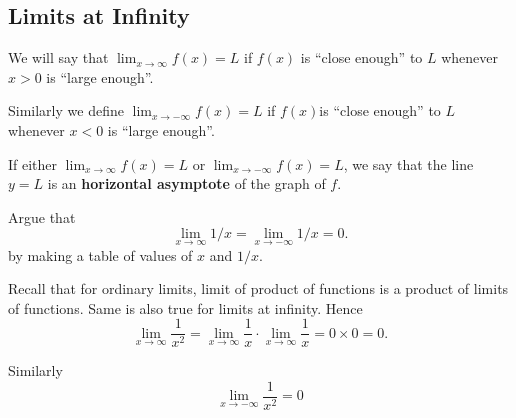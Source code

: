 \documentclass[calc1-main.tex]{subfiles}
\begin{document}
  \subsection*{Limits at Infinity}
  \begin{definition}
    We will say that $\lim_{x \to \infty} f(x)=L$ if $f(x)$ is ``close enough'' to $L$ whenever $x>0$ is ``large enough''.

    Similarly we define $\lim_{x \to -\infty} f(x) = L$ if $f(x)$is ``close enough'' to $L$ whenever $x<0$ is ``large enough''.

    If either $\lim_{x \to \infty} f(x)=L$ or $\lim_{x \to -\infty} f(x)=L$, we say that the line $y=L$ is an \textbf{horizontal asymptote} of the graph of $f$.
  \end{definition}

  \begin{example}
    Argue that
    \[
      \lim_{x \to \infty} 1/x = \lim_{x \to -\infty} 1/x = 0.
    \]
    by making a table of values of $x$ and $1/x$.

    \begin{figure}[H]
      \centering
      
    \end{figure}
  \end{example}
  Recall that for ordinary limits, limit of product of functions is a product of limits of functions. Same is also true for limits at infinity. Hence
  \[
    \lim_{x \to \infty} \frac{1}{x^2} =
    \lim_{x \to \infty} \frac{1}{x}  \cdot \lim_{x \to \infty} \frac{1}{x}  = 0 \times 0 = 0.
  \]

  Similarly
  \[
    \lim_{x \to -\infty} \frac{1}{x^2} = 0
  \]
\end{document}

